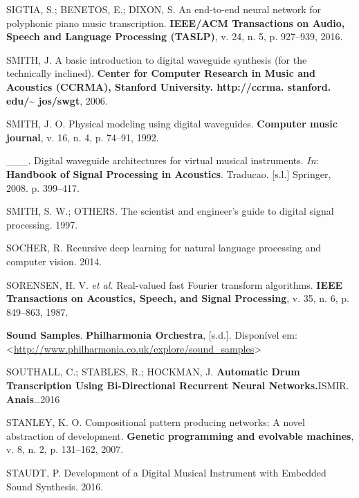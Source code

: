 \documentclass[]{article}
\begin{document}
\leavevmode\hypertarget{ref-sigtia2016end}{}%
SIGTIA, S.; BENETOS, E.; DIXON, S. An end-to-end neural network for
polyphonic piano music transcription. \textbf{IEEE/ACM Transactions on
Audio, Speech and Language Processing (TASLP)}, v. 24, n. 5, p.
927--939, 2016.

\leavevmode\hypertarget{ref-smith2006basic}{}%
SMITH, J. A basic introduction to digital waveguide synthesis (for the
technically inclined). \textbf{Center for Computer Research in Music and
Acoustics (CCRMA), Stanford University. http://ccrma. stanford.
edu/\textasciitilde{} jos/swgt}, 2006.

\leavevmode\hypertarget{ref-smith1992physical}{}%
SMITH, J. O. Physical modeling using digital waveguides.
\textbf{Computer music journal}, v. 16, n. 4, p. 74--91, 1992.

\leavevmode\hypertarget{ref-smith2008digital}{}%
\_\_\_. Digital waveguide architectures for virtual musical instruments.
\emph{In}: \textbf{Handbook of Signal Processing in Acoustics}.
Traducao. {[}s.l.{]} Springer, 2008. p. 399--417.

\leavevmode\hypertarget{ref-smith1997scientist}{}%
SMITH, S. W.; OTHERS. The scientist and engineer's guide to digital
signal processing. 1997.

\leavevmode\hypertarget{ref-socher2014recursive}{}%
SOCHER, R. Recursive deep learning for natural language processing and
computer vision. 2014.

\leavevmode\hypertarget{ref-sorensen1987real}{}%
SORENSEN, H. V. \emph{et al.} Real-valued fast Fourier transform
algorithms. \textbf{IEEE Transactions on Acoustics, Speech, and Signal
Processing}, v. 35, n. 6, p. 849--863, 1987.

\leavevmode\hypertarget{ref-philharmoniaorchestra}{}%
\textbf{Sound Samples}. \textbf{Philharmonia Orchestra}, {[}s.d.{]}.
Disponível em:
\textless{}\url{http://www.philharmonia.co.uk/explore/sound_samples}\textgreater{}

\leavevmode\hypertarget{ref-southall2016automatic}{}%
SOUTHALL, C.; STABLES, R.; HOCKMAN, J. \textbf{Automatic Drum
Transcription Using Bi-Directional Recurrent Neural Networks.}ISMIR.
\textbf{Anais}\ldots{}2016

\leavevmode\hypertarget{ref-stanley2007compositional}{}%
STANLEY, K. O. Compositional pattern producing networks: A novel
abstraction of development. \textbf{Genetic programming and evolvable
machines}, v. 8, n. 2, p. 131--162, 2007.

\leavevmode\hypertarget{ref-staudt2016development}{}%
STAUDT, P. Development of a Digital Musical Instrument with Embedded
Sound Synthesis. 2016.
\end{document}
